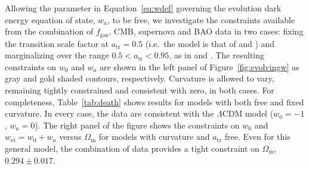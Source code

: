 \documentclass[useAMS,usenatbib,usegraphicx]{mn2e}
\newcommand*{\mysub}[2]{\ensuremath{#1_{\mathrm{#2}}}}
\newcommand*{\Omegam}{\mysub{\Omega}{m}}
\newcommand*{\fgas}{\mysub{f}{gas}}
\newcommand*{\LCDM}{\ensuremath{\Lambda}CDM}
\newcommand*{\atr}{\mysub{a}{tr}}
\newcommand*{\wet}{\mysub{w}{et}}
\newcommand*{\eqnref}{Equation}
\newcommand*{\figref}{Figure}
\newcommand*{\tabref}{Table}
\newcommand*{\arsemf}{\citetalias{Allen0706.0033}}
\begin{document}
 Allowing the parameter in \eqnref~\ref{eq:wdef} governing the evolution dark energy equation of state, $w_a$, to be free, we investigate the constraints available from the combination of \fgas{}, CMB, supernova and BAO data in two cases: fixing the transition scale factor at $\atr=0.5$ (i.e.\ the model is that of \citealt{Chevallier0009008} and \citealt{Linder0208512}) and marginalizing over the range $0.5<\atr<0.95$, as in \citet{Rapetti0409574} and \arsemf{}. The resulting constraints on $w_0$ and $w_a$ are shown in the left panel of \figref~\ref{fig:evolvingw} as gray and gold shaded contours, respectively. Curvature is allowed to vary, remaining tightly constrained and consistent with zero, in both cases. For completeness, \tabref~\ref{tab:death} shows results for models with both free and fixed curvature. In every case, the data are consistent with the \LCDM{} model ($w_0=-1$, $w_a=0$). The right panel of the figure shows the constraints on $w_0$ and $\wet=w_0+w_a$ versus \Omegam{} for models with curvature and $\atr$ free. Even for this general model, the combination of data provides a tight constraint on $\Omegam$, $0.294\pm0.017$.
\end{document}
